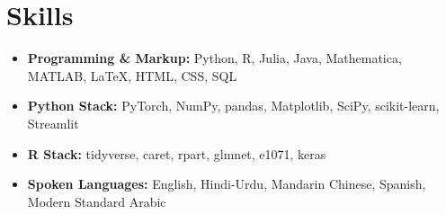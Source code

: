 \documentclass[letterpaper,10pt]{article}
\makeatletter
\newcommand{\resumeItem}[1]{
  \item\small{
    {#1 \vspace{-2pt}}
  }
}
\newcommand{\resumeSubheading}[4]{
    \item\vspace{-2pt}
    \begin{tabular*}{0.97\textwidth}[t]{l@{\extracolsep{\fill}}r}
      \textbf{#1} & #2 \\
      #3 & #4 \\
    \end{tabular*}%
}
\newcommand{\resumeSubHeadingListStart}{\begin{itemize}[leftmargin=0.15in, label=]}
\newcommand{\resumeSubHeadingListEnd}{\end{itemize}}
\makeatother
\begin{document}
\section{Skills}
\begin{itemize}[leftmargin=0.15in, label={}]
    \item \textbf{Programming \& Markup:} Python, R, Julia, Java, Mathematica, MATLAB, \LaTeX, HTML, CSS, SQL
    \item \vspace{-5pt} \textbf{Python Stack:} PyTorch, NumPy, pandas, Matplotlib, SciPy, scikit-learn, Streamlit
    \item \vspace{-5pt} \textbf{R Stack:} tidyverse, caret, rpart, glmnet, e1071, keras
    \item \vspace{-5pt} \textbf{Spoken Languages:} English, Hindi-Urdu, Mandarin Chinese, Spanish, Modern Standard Arabic
\end{itemize}







\end{document}
